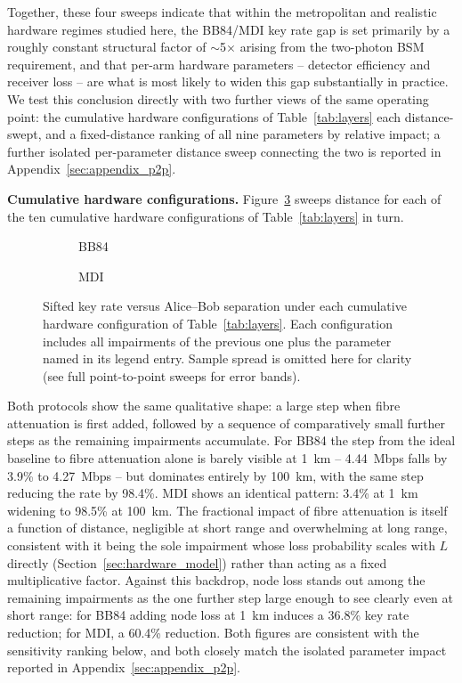 \documentclass[12pt]{article}
\begin{document}
Together, these four sweeps indicate that within the metropolitan and realistic hardware regimes studied here, the BB84/MDI key rate gap is set primarily by a roughly constant structural factor of $\sim$5$\times$ arising from the two-photon BSM requirement, and that per-arm hardware parameters -- detector efficiency and receiver loss -- are what is most likely to widen this gap substantially in practice. We test this conclusion directly with two further views of the same operating point: the cumulative hardware configurations of Table~\ref{tab:layers} each distance-swept, and a fixed-distance ranking of all nine parameters by relative impact; a further isolated per-parameter distance sweep connecting the two is reported in Appendix~\ref{sec:appendix_p2p}.

\textbf{Cumulative hardware configurations.} Figure~\ref{fig:layers} sweeps distance for each of the ten cumulative hardware configurations of Table~\ref{tab:layers} in turn.

\begin{figure}[hbtp]
    \centering
    \begin{subfigure}[t]{219pt}
        \centering
        
        \caption{BB84}
        \label{fig:layers_bb84}
    \end{subfigure}%
    \begin{subfigure}[t]{244pt}
        \centering
        
        \caption{MDI}
        \label{fig:layers_mdi}
    \end{subfigure}
    \caption{Sifted key rate versus Alice--Bob separation under each cumulative hardware configuration of Table~\ref{tab:layers}. Each configuration includes all impairments of the previous one plus the parameter named in its legend entry. Sample spread is omitted here for clarity (see full point-to-point sweeps for error bands).}
    \label{fig:layers}
\end{figure}

Both protocols show the same qualitative shape: a large step when fibre attenuation is first added, followed by a sequence of comparatively small further steps as the remaining impairments accumulate. For BB84 the step from the ideal baseline to fibre attenuation alone is barely visible at 1~km -- 4.44~Mbps falls by 3.9\% to 4.27~Mbps -- but dominates entirely by 100~km, with the same step reducing the rate by 98.4\%. MDI shows an identical pattern: 3.4\% at 1~km widening to 98.5\% at 100~km. The fractional impact of fibre attenuation is itself a function of distance, negligible at short range and overwhelming at long range, consistent with it being the sole impairment whose loss probability scales with $L$ directly (Section~\ref{sec:hardware_model}) rather than acting as a fixed multiplicative factor. Against this backdrop, node loss stands out among the remaining impairments as the one further step large enough to see clearly even at short range: for BB84 adding node loss at 1~km induces a 36.8\% key rate reduction; for MDI, a 60.4\% reduction. Both figures are consistent with the sensitivity ranking below, and both closely match the isolated parameter impact reported in Appendix~\ref{sec:appendix_p2p}.
\end{document}
